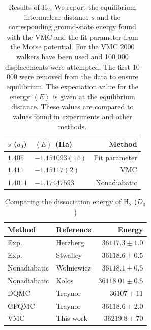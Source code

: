 \documentclass{article}
\begin{document}
\begin{table}
\caption{Results of H$_2$. We report the equilibrium internuclear distance $s$ and the corresponding ground-state energy found with the VMC and the fit parameter from the Morse potential. For the VMC 2000 walkers have been used and 100 000 displacements were attempted. The first 10 000 were removed from the data to ensure equilibrium. The expectation value for the energy $\left\langle E \right\rangle$ is given at the equilibrium distance. These values are compared to values found in experiments and other methods.}
\label{H2}
\centering
\begin{tabular}{llr}
\hline
$s$ ($a_0$) & $\left\langle E \right\rangle$ (Ha) & Method  \\ \hline
$1.405$ & $-1.151093(14)$ & Fit parameter \\
$1.411$ & $-1.15117(2)$   & VMC \\
$1.4011$ & $-1.17447593$ & Nonadiabatic \citep{wolniewicz1995nonadiabatic}
\end{tabular}
\end{table}

\begin{table}
\caption{Comparing the dissociation energy of H$_2$ ($D_0$)}\label{D_e}
\centering
\begin{tabular}{llr}
\hline
Method      & Reference                                   & Energy      \\ \hline
Exp.        & Herzberg \citep{herzberg1970dissociation}   & $36 117.3 \pm 1.0$ \\
Exp.        & Stwalley \citep{stwalley1970dissociation}   & $36 118.6 \pm 0.5$  \\
Nonadiabatic& Wolniewicz \citep{wolniewicz1983x}          & $36 118.1 \pm 0.5$ \\
Nonadiabatic& Kolos \citep{szalewicz1986new}              & $36 118.01 \pm 0.5$ \\
DQMC        & Traynor \citep{traynor1991quantum}          & $36 107 \pm 11$ \\
GFQMC       & Traynor \citep{traynor1991quantum}          & $36 118.6 \pm 2.0$ \\
VMC         & This work                                   & $36 219.8 \pm 70$  \\ \hline
\end{tabular}
\end{table}





\end{document}
